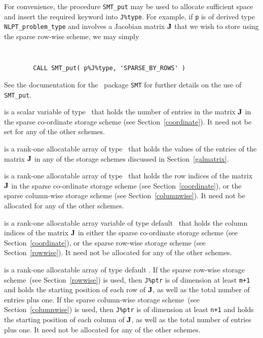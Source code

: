 \documentclass{galahad}
\begin{document}
\begin{description}
\begin{description}
For convenience, the procedure {\tt SMT\_put} may be used to allocate
sufficient space and insert the required keyword into {\tt J\%type}.
For example, if {\tt p} is of derived type {\tt NLPT\_problem\_type}
and involves a Jacobian matrix ${\mathbf{J}}$ that we wish to store using
the sparse row-wise scheme, we may simply
{\tt 
\begin{verbatim}
        CALL SMT_put( p%J%type, 'SPARSE_BY_ROWS' )
\end{verbatim}
}
\noindent
See the documentation for the \galahad\ package {\tt SMT} 
for further details on the use of {\tt SMT\_put}.

 is a scalar variable of type \integer\ that holds
the number of entries in the matrix ${\mathbf{J}}$ in the sparse co-ordinate
storage scheme (see Section~\ref{coordinate}).  It need not be set for
any of the other schemes.

 is a rank-one allocatable array of type \realdp\ that holds
the values of the entries of the matrix ${\mathbf{J}}$ in any of the 
storage schemes discussed in Section~\ref{galmatrix}.

 is a rank-one allocatable array of type \integer\
that holds the row indices of the matrix ${\mathbf{J}}$ in the sparse
co-ordinate storage scheme (see Section~\ref{coordinate}), or the
sparse column-wise storage scheme (see Section~\ref{columnwise}).  It
need not be allocated for any of the other schemes.

 is a rank-one allocatable array variable of type default
\integer\ that holds the column indices of the matrix ${\mathbf{J}}$ in
either the sparse co-ordinate storage scheme (see Section~\ref{coordinate}), or the
sparse row-wise storage scheme (see Section~\ref{rowwise}).  It need
not be allocated for any of the other schemes.

 is a rank-one allocatable array of type default
\integer.  If the sparse row-wise storage scheme~(see Section~\ref{rowwise})
is used, then {\tt J\%ptr} is of dimension at least {\tt m+1} and holds the
starting position of each row of ${\mathbf{J}}$, as well as the total number
of entries plus one.  If the sparse column-wise storage scheme~(see
Section~\ref{columnwise}) is used, then {\tt J\%ptr} is of dimension
at least {\tt n+1} and holds the starting position of each column of ${\mathbf{J}}$, as well as
the total number of entries plus one.  It need not be allocated for
any of the other schemes.


\end{description}
\end{description}
\end{document}

